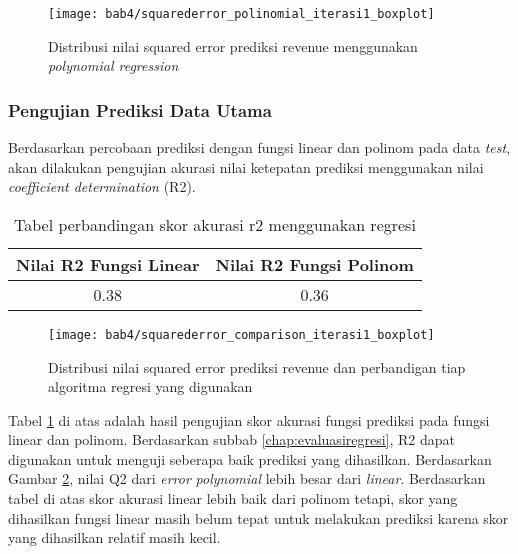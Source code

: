 \begin{figure}[H]
	\centering  
	\texttt{[image: bab4/squarederror\_polinomial\_iterasi1\_boxplot]}   
	\caption{Distribusi nilai  squared error prediksi revenue menggunakan \textit{polynomial regression} }
	\label{fig:squarederror_polinomial_iterasi1_boxplot} 
\end{figure} 



\subsubsection{Pengujian Prediksi Data Utama}
Berdasarkan percobaan prediksi dengan fungsi linear dan polinom pada data \textit{test}, akan dilakukan pengujian akurasi nilai ketepatan prediksi menggunakan nilai \textit{coefficient determination} (R2). 

\begin{table}[H]
\caption{Tabel perbandingan skor akurasi r2 menggunakan regresi} 
\centering
\begin{tabular}{|c|c|}
\hline 
Nilai R2 Fungsi Linear & Nilai R2 Fungsi Polinom \\ 
\hline 
 0.38& 0.36  \\ 
\hline 
\end{tabular}

\label{tab:tabelr2_iterasi1}
\end{table}


\begin{figure}[H]
	\centering  
	\texttt{[image: bab4/squarederror\_comparison\_iterasi1\_boxplot]}   
	\caption{Distribusi nilai  squared error prediksi revenue dan perbandigan tiap algoritma regresi yang digunakan  }
	\label{fig:squarederror_comparison_iterasi1_boxplot} 
\end{figure} 


Tabel \ref{tab:tabelr2_iterasi1} di atas adalah hasil pengujian skor akurasi fungsi prediksi pada fungsi linear dan polinom. Berdasarkan subbab \ref{chap:evaluasiregresi}, R2 dapat digunakan untuk menguji seberapa baik prediksi yang dihasilkan.  Berdasarkan Gambar \ref{fig:squarederror_comparison_iterasi1_boxplot}, nilai Q2 dari \textit{error} \textit{polynomial} lebih besar dari \textit{linear}. Berdasarkan tabel di atas skor akurasi linear lebih baik dari polinom tetapi, skor yang dihasilkan fungsi linear masih belum tepat untuk melakukan prediksi karena skor yang dihasilkan relatif masih kecil.


\pagebreak


